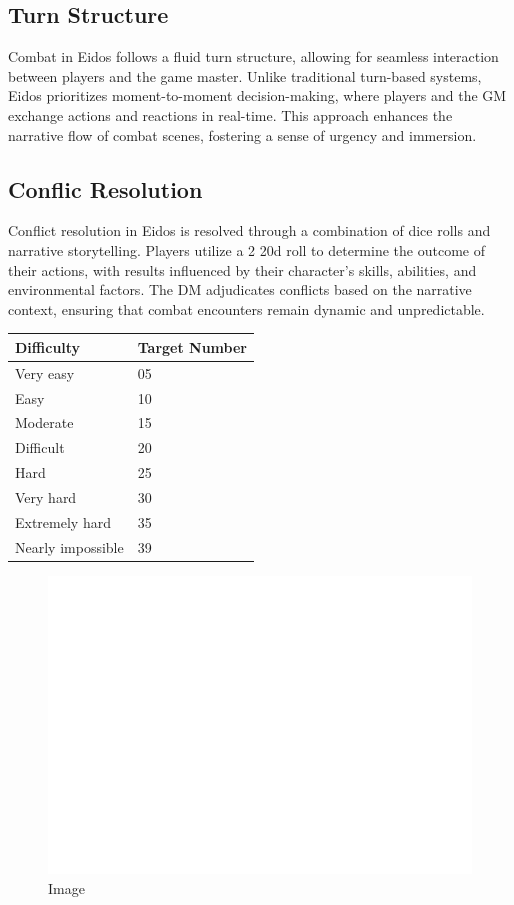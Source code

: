 \hypertarget{turn-structure}{%
\subsection{Turn Structure}\label{turn-structure}}

Combat in Eidos follows a fluid turn structure, allowing for seamless
interaction between players and the game master. Unlike traditional
turn-based systems, Eidos prioritizes moment-to-moment decision-making,
where players and the GM exchange actions and reactions in real-time.
This approach enhances the narrative flow of combat scenes, fostering a
sense of urgency and immersion.

\hypertarget{conflic-resolution}{%
\subsection{Conflic Resolution}\label{conflic-resolution}}

Conflict resolution in Eidos is resolved through a combination of dice
rolls and narrative storytelling. Players utilize a 2 20d roll to
determine the outcome of their actions, with results influenced by their
character's skills, abilities, and environmental factors. The DM
adjudicates conflicts based on the narrative context, ensuring that
combat encounters remain dynamic and unpredictable.

\begin{longtable}[]{@{}ll@{}}
\toprule
Difficulty & Target Number \\
\midrule
\endhead
Very easy & 05 \\
Easy & 10 \\
Moderate & 15 \\
Difficult & 20 \\
Hard & 25 \\
Very hard & 30 \\
Extremely hard & 35 \\
Nearly impossible & 39 \\
\bottomrule
\end{longtable}

\begin{figure}
\centering
\includegraphics{./images/combat02.svg}
\caption{Image}
\end{figure}

